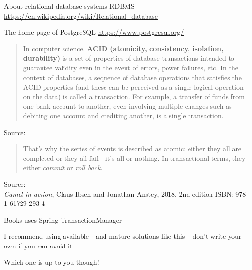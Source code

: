 \documentclass[Screen16to9,17pt]{foils}
\begin{document}
\begin{list2}
\item  About relational database systems RDBMS \url{https://en.wikipedia.org/wiki/Relational_database}
\item The home page of PostgreSQL \url{https://www.postgresql.org/}
\end{list2}




\begin{quote}
In computer science, {\bf ACID (atomicity, consistency, isolation, durability)} is a set of properties of database transactions intended to guarantee validity even in the event of errors, power failures, etc. In the context of databases, a sequence of database operations that satisfies the ACID properties (and these can be perceived as a single logical operation on the data) is called a transaction. For example, a transfer of funds from one bank account to another, even involving multiple changes such as debiting one account and crediting another, is a single transaction.
\end{quote}

Source: {\footnotesize\\
}



\begin{quote}
  That’s why the series of events is described as atomic:
  either they all are completed or they all fail—it’s all or nothing. In transactional terms,
  they either \emph{commit} or \emph{roll back}.

\end{quote}
Source: {\footnotesize\\
\emph{Camel in action}, Claus Ibsen and Jonathan Anstey, 2018, 2nd edition
ISBN: 978-1-61729-293-4}

\begin{list2}
\item Books uses Spring TransactionManager
\item I recommend using available - and mature solutions like this -- don't write your own if you can avoid it
\item Which one is up to you though!
\end{list2}



\end{document}
